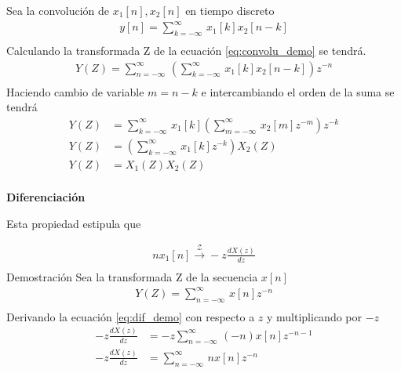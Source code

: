 \documentclass[12pt]{article}
\begin{document}
Sea la convolución de $x_{1}[n],x_{2}[n]$ en tiempo discreto
\begin{equation}
    \begin{split}
        y[n]=\displaystyle\sum_{k=-\infty}^{\infty}\,x_{1}[k]x_{2}[n-k]\\
    \end{split}
    \label{eq:convolu_demo}
\end{equation}
Calculando la transformada Z de la ecuación \ref{eq:convolu_demo} se tendrá.
\begin{equation}
    \begin{split}
        Y(Z)=\displaystyle\sum_{n=-\infty}^{\infty}\,(\displaystyle\sum_{k=-\infty}^{\infty}\,x_{1}[k]x_{2}[n-k])z^{-n}\\
    \end{split}
    \label{eq:convolu_demo1}
\end{equation}
Haciendo cambio de variable $m=n-k$ e intercambiando el orden de la suma se tendrá
\begin{equation}
    \begin{split}
        Y(Z)&=\displaystyle\sum_{k=-\infty}^{\infty}\,x_{1}[k](\displaystyle\sum_{m=-\infty}^{\infty}\,x_{2}[m]z^{-m})z^{-k}\\
        Y(Z)&=(\displaystyle\sum_{k=-\infty}^{\infty}\,x_{1}[k]z^{-k})X_{2}(Z)\\
        Y(Z)&=X_{1}(Z)X_{2}(Z)\\
    \end{split}
    \label{eq:convolu_demo2}
\end{equation}

\textbf{Diferenciación}
\vspace{5mm}

Esta propiedad estipula que\par
\begin{equation}
    \begin{split}
        nx_{1}[n]\xrightarrow{\mathscr{Z}}-z\frac{dX(z)}{dz}\\
    \end{split}
    \label{eq:dif}
\end{equation}
Demostración
Sea la transformada Z de la secuencia $x[n]$ 
\begin{equation}
    \begin{split}
        Y(Z)=\displaystyle\sum_{n=-\infty}^{\infty}\,x[n]z^{-n}\\
    \end{split}
    \label{eq:dif_demo}
\end{equation}
Derivando la ecuación \ref{eq:dif_demo} con respecto a $z$ y multiplicando por $-z$
\begin{equation}
    \begin{split}
        -z\frac{dX(z)}{dz}&=-z\displaystyle\sum_{n=-\infty}^{\infty}\,(-n)x[n]z^{-n-1}\\
        -z\frac{dX(z)}{dz}&=\displaystyle\sum_{n=-\infty}^{\infty}\,nx[n]z^{-n}\\
    \end{split}
    \label{eq:dif_demo1}
\end{equation}
\end{document}
